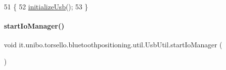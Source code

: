 \begin{DoxyCode}
51                            \{
52         \hyperlink{classit_1_1unibo_1_1torsello_1_1bluetoothpositioning_1_1util_1_1UsbUtil_a12b05cc1420c35ea8072d16253ab362e_a12b05cc1420c35ea8072d16253ab362e}{initializeUsb}();
53     \}
\end{DoxyCode}
\hypertarget{classit_1_1unibo_1_1torsello_1_1bluetoothpositioning_1_1util_1_1UsbUtil_ae6dea43af2962f682be4e87b11699c00_ae6dea43af2962f682be4e87b11699c00}{}\label{classit_1_1unibo_1_1torsello_1_1bluetoothpositioning_1_1util_1_1UsbUtil_ae6dea43af2962f682be4e87b11699c00_ae6dea43af2962f682be4e87b11699c00} 
\paragraph{\texorpdfstring{start\+Io\+Manager()}{startIoManager()}}
{\footnotesize\ttfamily void it.\+unibo.\+torsello.\+bluetoothpositioning.\+util.\+Usb\+Util.\+start\+Io\+Manager (\begin{DoxyParamCaption}{ }\end{DoxyParamCaption})\hspace{0.3cm}{\ttfamily [private]}}


